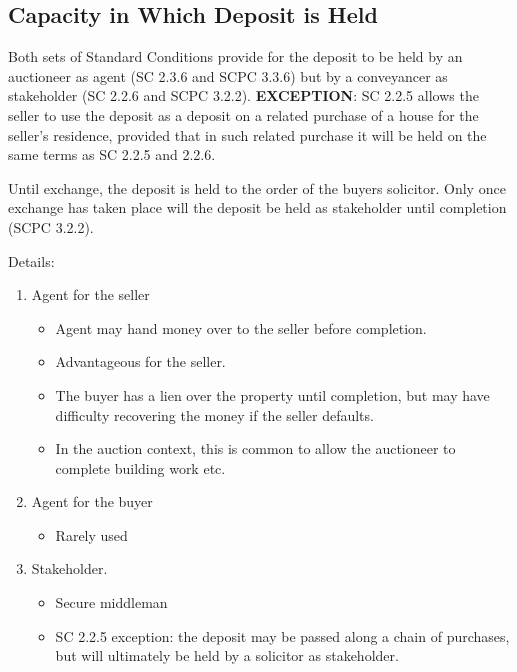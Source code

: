 \documentclass[
]{article}
\newenvironment{Shaded}{}{}
\newcommand{\NormalTok}[1]{#1}
\providecommand{\tightlist}{%
  \setlength{\itemsep}{0pt}\setlength{\parskip}{0pt}}
\begin{document}
\hypertarget{capacity-in-which-deposit-is-held}{%
\subsection{Capacity in Which Deposit is
Held}\label{capacity-in-which-deposit-is-held}}

Both sets of Standard Conditions provide for the deposit to be held by
an auctioneer as agent (SC 2.3.6 and SCPC 3.3.6) but by a conveyancer as
stakeholder (SC 2.2.6 and SCPC 3.2.2). \textbf{EXCEPTION}: SC 2.2.5
allows the seller to use the deposit as a deposit on a related purchase
of a house for the seller's residence, provided that in such related
purchase it will be held on the same terms as SC 2.2.5 and 2.2.6.

\begin{Shaded}
\begin{Highlighting}[]
\NormalTok{Until exchange, the deposit is held to the order of the buyer\textquotesingle{}s solicitor. Only once exchange has taken place will the deposit be held as stakeholder until completion (SCPC 3.2.2).}
\end{Highlighting}
\end{Shaded}

Details:

\begin{enumerate}
\def\labelenumi{\arabic{enumi}.}
\tightlist
\item
  Agent for the seller

  \begin{itemize}
  \tightlist
  \item
    Agent may hand money over to the seller before completion.
  \item
    Advantageous for the seller.
  \item
    The buyer has a lien over the property until completion, but may
    have difficulty recovering the money if the seller defaults.
  \item
    In the auction context, this is common to allow the auctioneer to
    complete building work etc.
  \end{itemize}
\item
  Agent for the buyer

  \begin{itemize}
  \tightlist
  \item
    Rarely used
  \end{itemize}
\item
  Stakeholder.

  \begin{itemize}
  \tightlist
  \item
    Secure middleman
  \item
    SC 2.2.5 exception: the deposit may be passed along a chain of
    purchases, but will ultimately be held by a solicitor as
    stakeholder.
  \end{itemize}
\end{enumerate}
\end{document}
